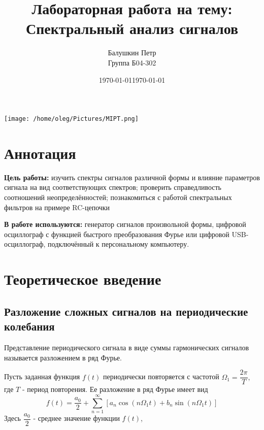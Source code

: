 \documentclass[a4paper,12pt]{article} %
\date{\today}
\begin{document}
\begin{titlepage}
    \title{Лабораторная работа на тему: \\    
    Спектральный анализ сигналов}
    \author{Балушкин Петр \\
    Группа Б04-302}
    \date{\today}
    \maketitle
    \vfill
    \begin{center}
        \texttt{[image: /home/oleg/Pictures/MIPT.png]}
    \end{center}
\end{titlepage}



\section{Аннотация}
\indent
\indent \textbf{Цель работы:} изучить спектры сигналов различной формы и влияние параметров сигнала
на вид соответствующих спектров; проверить справедливость соотношений неопределённостей; познакомиться с работой спектральных фильтров на примере RC-цепочки

\indent \textbf{В работе используются:} генератор сигналов произвольной формы, цифровой осциллограф с функцией быстрого преобразования Фурье или цифровой USB-осциллограф, подключённый к персональному компьютеру.





\section{Теоретическое введение}

\subsection*{Разложение сложных сигналов на периодические колебания}
Представление периодического сигнала в виде суммы гармонических сигналов называется разложением в ряд Фурье.
	
	Пусть заданная функция $f(t)$ периодически повторяется с частотой $\Omega_{1}=\dfrac{2\pi}{T},$ где $T$ - период повторения. Ее разложение в ряд Фурье имеет вид
\begin{equation}
    f(t)=\dfrac{a_{0}}{2}+ \sum\limits_{n=1}^\infty [a_{n}\cos(n \Omega_{1}t)+b_{n}\sin(n \Omega_{1} t) ]
\label{eq1}
\end{equation}
		Здесь $\dfrac{a_{0}}{2}$ - среднее значение функции $f(t)$,
	
\end{document}
